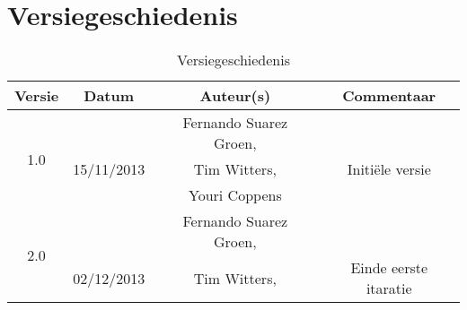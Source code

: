 \chapter{Versiegeschiedenis}

\begin{table}[htbp]
	\centering
	\begin{tabular} {|c|c|c|c|}
	    \hline
		\textbf{Versie} & \textbf{Datum} 	& \textbf{Auteur(s)} & \textbf{Commentaar} \\
		\hline
		\multirow{3}{*}{1.0 }   &  & Fernando Suarez Groen, &  \\
		                        & 15/11/2013  & Tim Witters,  & Initi\"{e}le versie\\
		                        &   & Youri Coppens & \\ \hline
		\hline
		\multirow{3}{*}{2.0 }   &  & Fernando Suarez Groen, &  \\
		                        & 02/12/2013  & Tim Witters,  & Einde eerste itaratie\\ \hline
		                        
	\end{tabular}
	\caption{Versiegeschiedenis}
\end{table}